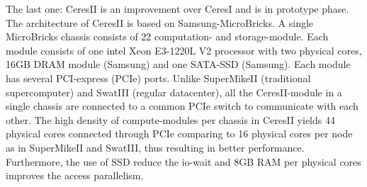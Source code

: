 \documentclass[conference]{IEEEtran}
\begin{document}
The last one: CeresII is an improvement over CeresI \cite{Cluster:ceres1} and is in prototype phase. 
The architecture of CeresII is based on Samsung-MicroBricks.
A single MicroBricks chassis consists of 22 computation- and storage-module.
Each module consists of one intel Xeon E3-1220L V2 processor with two physical cores, 16GB DRAM module (Samsung) and  one SATA-SSD (Samsung).
Each module has several PCI-express (PCIe) ports.
Unlike SuperMikeII (traditional supercomputer) and SwatIII (regular datacenter), all the CeresII-module in a single chassis are connected to a common PCIe switch to communicate with each other.
The high density of compute-modules per chassis in CeresII yields 44 physical cores connected through PCIe comparing to 16 physical cores per node as in SuperMikeII and SwatIII, thus resulting in better performance.
Furthermore, the use of SSD reduce the io-wait and 8GB RAM per physical cores improves the access parallelism.

\end{document}
